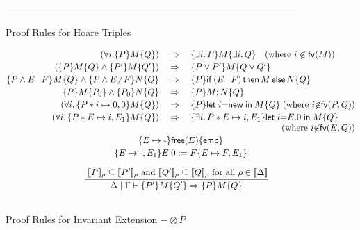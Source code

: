\documentclass{LMCS}
\newcommand{\new}{\mathsf{new}}
\newcommand{\free}{\mathsf{free}}
\newcommand{\ifz}{\mathsf{if}}
\newcommand{\mletin}[2]{\mathsf{let}\;{#1}\;\mathsf{in}\;{#2}}
\newcommand{\blank}{\mbox{-}}
\newcommand{\emp}{\mathsf{emp}}
\newcommand{\pointsto}{\mapsto}
\newcommand{\FV}{\mathsf{fv}}
\newcommand{\ff}[1]{[\![#1]\!]}
\newcommand{\mtri}[3]{\{{#1}\}{#2}\{{#3}\}}
\newcommand{\then}{\mathsf{then}}
\newcommand{\melse}{\mathsf{else}}
\begin{document}
\begin{figure*}[t]
\hrule
$\,$

\begin{center}
{\sc Proof Rules for Hoare Triples}
\end{center}

$$
\begin{array}{@{}rcl@{}}
(\forall i. \mtri{P}{M}{Q}) 
  & \;\Rightarrow\; &
  \mtri{\exists i.\,P}{M}{\exists i.\,Q}
  \quad
  (\mbox{where $i\not\in \FV(M)$})
\\[0.5ex]
(\mtri{P}{M}{Q} \wedge \mtri{P'}{M}{Q'})
  & \;\Rightarrow\; &
  \mtri{P \vee P'}{M}{Q \vee Q'}
\\[0.5ex]
  \mtri{P \wedge E{=}F}{M}{Q}
  \wedge
  \mtri{P \wedge E{\not=}F}{N}{Q}
  & \;\Rightarrow\; &
  \mtri{P}{\ifz\,(E{=}F)\,\then\,M\,\melse\,N}{Q}
\\[0.5ex]
\mtri{P}{M}{P_0} 
  \wedge
  \mtri{P_0}{N}{Q}
  & \;\Rightarrow\; &
  \mtri{P}{M;N}{Q}
\\[0.5ex]
(\forall i.\,\mtri{P*i\pointsto 0,0}{M}{Q})
  & \;\Rightarrow\; &
  \mtri{P}{\mletin{i{=}\new}{M}}{Q}
  \;\hfill
  (\mbox{where $i{\not\in} \FV(P,Q)$})
\\[0.5ex]
(\forall i.\, \mtri{P*E\pointsto i,E_1}{M}{Q})
  & \;\Rightarrow\; &
  \mtri{\exists i.\,P*E\pointsto i,E_1}{\mletin{i{=}E.0}{M}}{Q}
\\
&&
\hfill
  (\mbox{where $i{\not\in} \FV(E,Q)$})
\\[0.5ex]
\multicolumn{3}{c}{
  \mtri{E\pointsto \blank}{\free(E)}{\emp}
}
\\[0.5ex]
\multicolumn{3}{c}{
  \mtri{E\pointsto \blank,E_1}{E.0 := F}{E\pointsto F,E_1}
}
\\[2.5ex]
\multicolumn{3}{c}{
\infer{
  \Delta \mid \Gamma \vdash
   \mtri{P'}{M}{Q'} 
   \Rightarrow
   \mtri{P}{M}{Q}
}{
  \mbox{
  $\ff{P}_\rho \subseteq \ff{P'}_\rho$ and
  $\ff{Q'}_\rho \subseteq \ff{Q}_\rho$
  for all $\rho \in \ff{\Delta}$}
}
\quad
}
\\
\\
\end{array}
$$

\begin{center}
{\sc Proof Rules for Invariant Extension $-\otimes P$}
\end{center}


\end{figure*}
\end{document}
